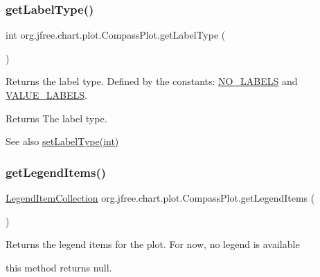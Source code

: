 \subsubsection{\texorpdfstring{get\+Label\+Type()}{getLabelType()}}
{\footnotesize\ttfamily int org.\+jfree.\+chart.\+plot.\+Compass\+Plot.\+get\+Label\+Type (\begin{DoxyParamCaption}{ }\end{DoxyParamCaption})}

Returns the label type. Defined by the constants\+: \mbox{\hyperlink{classorg_1_1jfree_1_1chart_1_1plot_1_1_compass_plot_aacee7aaaf48f3533c090c727ad84f846}{N\+O\+\_\+\+L\+A\+B\+E\+LS}} and \mbox{\hyperlink{classorg_1_1jfree_1_1chart_1_1plot_1_1_compass_plot_aa8a73d04fdb2883067183121de51ecf5}{V\+A\+L\+U\+E\+\_\+\+L\+A\+B\+E\+LS}}.

\begin{DoxyReturn}{Returns}
The label type.
\end{DoxyReturn}
\begin{DoxySeeAlso}{See also}
\mbox{\hyperlink{classorg_1_1jfree_1_1chart_1_1plot_1_1_compass_plot_a5ab37f95ad344e28b5f78f4d61443b48}{set\+Label\+Type(int)}} 
\end{DoxySeeAlso}
\mbox{\label{classorg_1_1jfree_1_1chart_1_1plot_1_1_compass_plot_adc5fd675872d34dce951cb40937152bb}} 
\subsubsection{\texorpdfstring{get\+Legend\+Items()}{getLegendItems()}}
{\footnotesize\ttfamily \mbox{\hyperlink{classorg_1_1jfree_1_1chart_1_1_legend_item_collection}{Legend\+Item\+Collection}} org.\+jfree.\+chart.\+plot.\+Compass\+Plot.\+get\+Legend\+Items (\begin{DoxyParamCaption}{ }\end{DoxyParamCaption})}

Returns the legend items for the plot. For now, no legend is available
\begin{DoxyItemize}
\item this method returns null.
\end{DoxyItemize}


